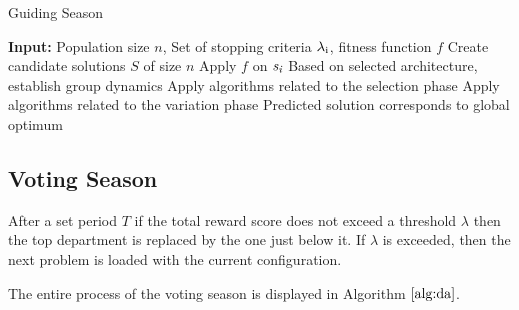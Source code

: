\documentclass[conference]{IEEEtran}
\begin{document}
\begin{algorithm}[!t]
\footnotesize
\caption{Guiding Season}
\label{alg:gs}
\begin{algorithmic}[1]
\STATE \textbf{Input:} Population size $\textit{n}$, Set of stopping criteria $\lambda\textsubscript{i}$, fitness function $\textit{f}$
\STATE Create candidate solutions $\textit{S}$ of size $\textit{n}$ 
\STATE Apply $\textit{f}$ on $\textit{s\textsubscript{i}}$
\ENDFOR
\STATE Based on selected architecture, establish group dynamics
\STATE Apply algorithms related to the selection phase
\ELSE
\STATE Apply algorithms related to the variation phase
\ENDIF
\ENDWHILE
\STATE Predicted solution corresponds to global optimum
\end{algorithmic}
\end{algorithm}

\subsection{Voting Season}

After a set period $\textit{T}$ if the total reward score does not exceed a threshold $\lambda$ then the top department is replaced by the one just below it. If $\lambda$ is exceeded, then the next problem is loaded with the current configuration.

The entire process of the voting season is displayed in Algorithm $\ref{alg:da}$.
\end{document}
